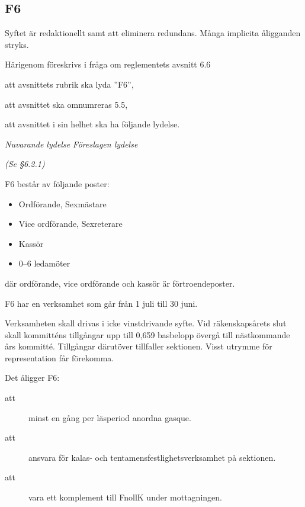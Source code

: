 \documentclass{article}
\newenvironment{lydelse}
    {\begin{paracol}{2}%
        \emph{Nuvarande lydelse}%
        \switchcolumn%
        \emph{Föreslagen lydelse}%
    \end{paracol}%
    \begin{enumerate}[label=\thesubsection.\arabic*]%
    \begin{paracol}{2}%
    }{\end{paracol}\end{enumerate}}
\begin{document}
\subsection{F6}
Syftet är redaktionellt samt att eliminera redundans.
Många implicita åligganden stryks.

Härigenom föreskrivs i fråga om reglementets avsnitt 6.6

\begin{dels}
    \item att avsnittets rubrik ska lyda ''F6'',
    \item att avsnittet ska omnumreras 5.5,
    \item att avsnittet i sin helhet ska ha följande lydelse.
\end{dels}

\begin{lydelse}

    \item[] \emph{(Se \S6.2.1)}
    
    \setcounter{section}{6}
    \setcounter{subsection}{6}
    
    \item F6 består av följande poster:
	\begin{itemize}
		\item Ordförande, Sexmästare
		\item Vice ordförande, Sexreterare
		\item Kassör
		\item 0--6 ledamöter
	\end{itemize}
    där ordförande, vice ordförande och kassör är förtroendeposter.

    \item F6 har en verksamhet som går från 1 juli till 30 juni.

	\item Verksamheten skall drivas i icke vinstdrivande syfte. Vid räkenskapsårets slut skall kommitténs tillgångar upp till 0,659 basbelopp övergå till nästkommande års kommitté. Tillgångar därutöver tillfaller sektionen. Visst utrymme för representation får förekomma.

    \item Det åligger F6:
	\begin{description}
		\item[att] minst en gång per läsperiod anordna gasque.
		\item[att] ansvara för kalas- och tentamensfestlighetsverksamhet på sektionen.
		\item[att] vara ett komplement till FnollK under mottagningen.
	\end{description}
	

\end{lydelse}
\end{document}
